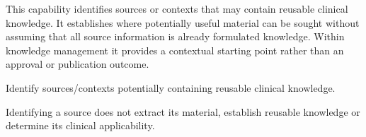 This capability identifies sources or contexts that may contain reusable clinical knowledge. It establishes where potentially useful material can be sought without assuming that all source information is already formulated knowledge. Within knowledge management it provides a contextual starting point rather than an approval or publication outcome.



Identify sources/\allowbreak{}contexts potentially containing reusable clinical knowledge.



Identifying a source does not extract its material, establish reusable knowledge or determine its clinical applicability.


